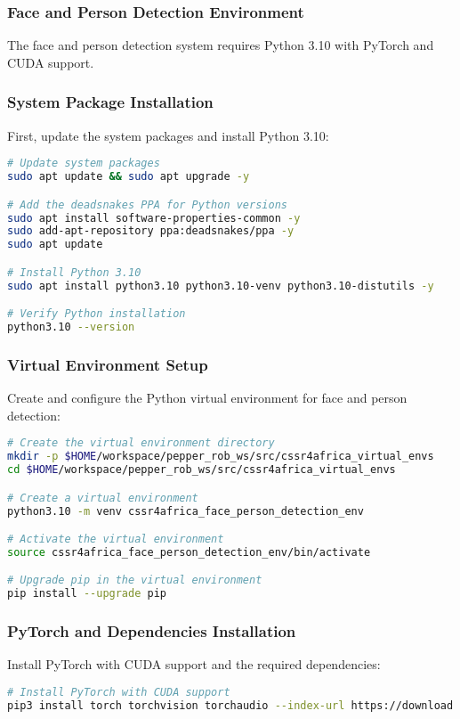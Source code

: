 \documentclass{CSSRforAfrica}
\begin{document}
{\subsubsection*{Face and Person Detection Environment}
The face and person detection system requires Python 3.10 with PyTorch and CUDA support.

\subsubsection*{System Package Installation}
First, update the system packages and install Python 3.10:
\begin{lstlisting}[style=withoutNumbering, language=bash]
# Update system packages
sudo apt update && sudo apt upgrade -y

# Add the deadsnakes PPA for Python versions
sudo apt install software-properties-common -y
sudo add-apt-repository ppa:deadsnakes/ppa -y
sudo apt update

# Install Python 3.10
sudo apt install python3.10 python3.10-venv python3.10-distutils -y

# Verify Python installation
python3.10 --version
\end{lstlisting}

\subsubsection*{Virtual Environment Setup}
Create and configure the Python virtual environment for face and person detection:
\begin{lstlisting}[style=withoutNumbering, language=bash]
# Create the virtual environment directory
mkdir -p $HOME/workspace/pepper_rob_ws/src/cssr4africa_virtual_envs
cd $HOME/workspace/pepper_rob_ws/src/cssr4africa_virtual_envs

# Create a virtual environment
python3.10 -m venv cssr4africa_face_person_detection_env

# Activate the virtual environment
source cssr4africa_face_person_detection_env/bin/activate

# Upgrade pip in the virtual environment
pip install --upgrade pip
\end{lstlisting}

\subsubsection*{PyTorch and Dependencies Installation}
Install PyTorch with CUDA support and the required dependencies:
\begin{lstlisting}[style=withoutNumbering, language=bash]
# Install PyTorch with CUDA support
pip3 install torch torchvision torchaudio --index-url https://download.pytorch.org/whl/cu118


\end{lstlisting}}
\end{document}

